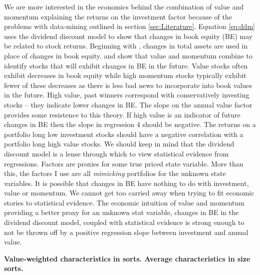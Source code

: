 We are more interested in the economics behind the combination of value and momentum
explaining the returns on the investment factor because of the problems with data-mining
outlined in section \ref{sec:Literature}. Equation \ref{eq:ddm} uses the dividend discount
model to show that changes in book equity (BE) may be related to stock returns. Beginning
with \parencite{fama2006profitability}, changes in total assets are used in place of
changes in book equity. \textcite{kok2017facts} and \textcite{asness2013devil} show that
value and momentum combine to identify stocks that will exhibit changes in BE in the
future. Value stocks often exhibit decreases in book equity while high momentum stocks
typically exhibit fewer of these decreases as there is less bad news to incorporate into
book values in the future. High value, past winners correspond with conservatively
investing stocks -- they indicate lower changes in BE. The slope on the annual value
factor provides some resistence to this theory. If high value is an indicator of future
changes in BE then the slope in regression 4 should be negative. The returns on a
portfolio long low investment stocks should have a negative correlation with a portfolio
long high value stocks. We should keep in mind that the dividend discount model is a lense
through which to view statistical evidence from regressions. Factors are proxies for some
true priced state variable. More than this, the factors I use are all \emph{mimicking}
portfolios for the unknown state variables. It is possible that changes in BE have nothing
to do with investment, value or momentum. We cannot get too carried away when trying to
fit economic stories to statistical evidence. The economic intuition of value and momentum
providing a better proxy for an unknown stat variable, changes in BE in the dividend
discount model, coupled with statistical evidence is strong enough to not be thrown off by
a positive regression slope between investment and annual value.


\textbf{Value-weighted characteristics in sorts. Average characteristics in size sorts.}
